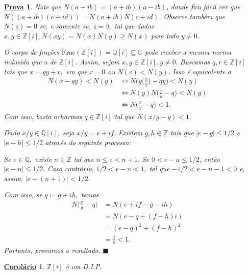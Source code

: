 \documentclass{article}
\newtheorem*{proof*}{\underline{Prova}}
\newtheorem*{crl*}{\underline{Corolário}}
\renewcommand\qedsymbol{$\blacksquare$}
\begin{document}
\begin{proof*}
  Note que \(N(a+ib) = (a+ib)(a-ib)\), donde fica fácil ver que \(N((a+ib)(c+id)) = N(a+ib)N(c+id)\).
  Observe também que \(N(z) = 0\) se, e somente se, \(z = 0,\) tal que dados \(x, y\in \mathbb{Z}[i], N(xy) = N(x)N(y)
  \geq N(x)\) para todo \(y\neq0\).

  O corpo de frações \(\mathrm{Frac}(\mathbb{Z}[i]) = \mathbb{Q}[i] \subseteq{\mathbb{C}}\) pode receber a mesma norma
  induzida que a de \(\mathbb{Z}[i]\). Assim, sejam \(x, y\in \mathbb{Z}[i], y\neq0.\) Buscamos \(q, r\in \mathbb{Z}[i]\) tais que
  \(x = qy + r,\) em que \(r=0\) ou \(N(r) < N(y)\). Isso é equivalente a
  \begin{align*}
    N(x-qy) < N(y) &\Longleftrightarrow N \biggl(y \biggl(\frac{x}{y}\biggr) - qy\biggr) < N(y)\\
                   &\Longleftrightarrow N(y) N \biggl(\frac{x}{y}-q\biggr) < N(y)\\
                   &\Longleftrightarrow N \biggl(\frac{x}{y} - q\biggr) < 1.
  \end{align*}
  Com isso, basta acharmos \(q\in \mathbb{Z}[i]\) tal que \(N(x/y - q) < 1.\)

  Dado \(x/y\in \mathbb{Q}[i],\) seja \(x/y = e + if.\) Existem \(g, h\in \mathbb{Z}\)
  tais que \(|e-g|\leq 1/2\) e \(|e-h|\leq 1/2\) através do seguinte processo:

  Se \(e\in \mathbb{Q},\) existe \(n\in \mathbb{Z}\) tal que \(n\leq e < n+1.\) Se \(0 < e-n\leq 1/2\),
  então \(|e-n|\leq 1/2\). Caso contrário, \(1/2 < e-n < 1,\) tal que \(-1/2 < e - n - 1 < 0\) e, assim,
  \(|e-(n+1)| < 1/2\).

  Com isso, se \(q\coloneqq g + ih,\) temos 
  \begin{align*}
    N \biggl(\frac{x}{y} - q\biggr) &= N(e + if - g - ih)\\
                                    &= N(e - q + (f-h)i)\\
                                    &= (e-q)^{2} + (f-h)^{2}\\
                                    &=\frac{1}{2} < 1.
  \end{align*}
  Portanto, provamos o resultado. \qedsymbol
\end{proof*}
\begin{crl*}
  \(\mathbb{Z}[i]\) é um D.I.P.
\end{crl*}
\end{document}
